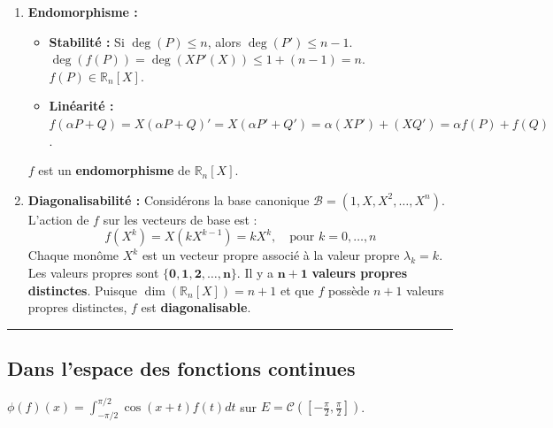 \documentclass[french]{yLectureNote}
\begin{document}
\begin{enumerate}
    \item \textbf{Endomorphisme :}
    \begin{itemize}
        \item \textbf{Stabilité :} Si $\deg(P) \le n$, alors $\deg(P') \le n-1$. $\deg(f(P)) = \deg(X P'(X)) \le 1 + (n-1) = n$. $f(P) \in \mathbb{R}_{n}[X]$.
        \item \textbf{Linéarité :} $f(\alpha P + Q) = X (\alpha P + Q)' = X (\alpha P' + Q') = \alpha (X P') + (X Q') = \alpha f(P) + f(Q)$.
    \end{itemize}
    $f$ est un \textbf{endomorphisme} de $\mathbb{R}_{n}[X]$.

    \item \textbf{Diagonalisabilité :}
    Considérons la base canonique $\mathcal{B} = (1, X, X^2, \ldots, X^n)$.
    L'action de $f$ sur les vecteurs de base est :
    $$f(X^k) = X (k X^{k-1}) = k X^k, \quad \text{pour } k=0, \ldots, n$$
    Chaque monôme $X^k$ est un vecteur propre associé à la valeur propre $\lambda_k = k$.
    Les valeurs propres sont $\mathbf{\{0, 1, 2, \ldots, n\}}$.
    Il y a $\mathbf{n+1}$ \textbf{valeurs propres distinctes}.
    Puisque $\dim(\mathbb{R}_n[X]) = n+1$ et que $f$ possède $n+1$ valeurs propres distinctes, $f$ est \textbf{diagonalisable}.
\end{enumerate}

\hrule

\subsection{Dans l'espace des fonctions continues}
$\phi(f)(x)=\int_{-\pi/2}^{\pi/2}\cos(x+t)f(t)dt$ sur $E=\mathcal{C}([-\frac{\pi}{2},\frac{\pi}{2}])$.
\end{document}
